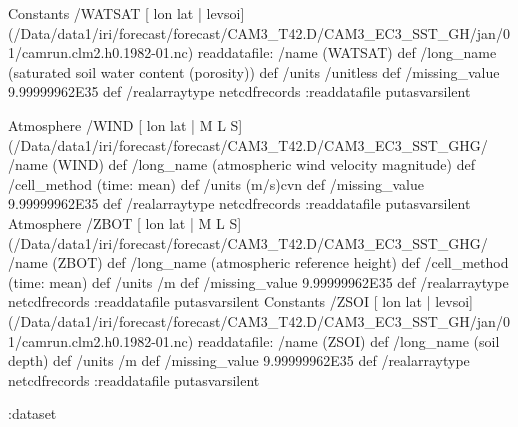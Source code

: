 \begin{ingrid}
Constants /WATSAT{
[ lon lat | levsoi] (/Data/data1/iri/forecast/forecast/CAM3_T42.D/CAM3_EC3_SST_GH/jan/01/camrun.clm2.h0.1982-01.nc) readdatafile:
/name (WATSAT) def
 /long_name (saturated soil water content (porosity)) def
 /units /unitless def
 /missing_value 9.99999962E35 def
 /realarraytype netcdfrecords :readdatafile
}putasvarsilent

Atmosphere /WIND{
[ lon lat | M L S] (/Data/data1/iri/forecast/forecast/CAM3_T42.D/CAM3_EC3_SST_GHG/%
/name (WIND) def
 /long_name (atmospheric wind velocity magnitude) def
 /cell_method (time: mean) def
 /units (m/s)cvn def
 /missing_value 9.99999962E35 def
 /realarraytype netcdfrecords :readdatafile
}putasvarsilent
Atmosphere /ZBOT{
[ lon lat | M L S] (/Data/data1/iri/forecast/forecast/CAM3_T42.D/CAM3_EC3_SST_GHG/%
/name (ZBOT) def
 /long_name (atmospheric reference height) def
 /cell_method (time: mean) def
 /units /m def
 /missing_value 9.99999962E35 def
 /realarraytype netcdfrecords :readdatafile
}putasvarsilent
Constants /ZSOI{
[ lon lat | levsoi] (/Data/data1/iri/forecast/forecast/CAM3_T42.D/CAM3_EC3_SST_GH/jan/01/camrun.clm2.h0.1982-01.nc) readdatafile:
/name (ZSOI) def
 /long_name (soil depth) def
 /units /m def
 /missing_value 9.99999962E35 def
 /realarraytype netcdfrecords :readdatafile
}putasvarsilent

:dataset
\end{ingrid}
